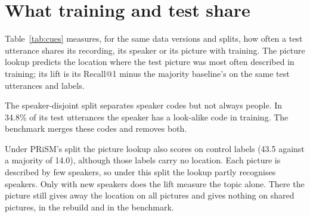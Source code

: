 \documentclass[11pt]{article}
\begin{document}
\section{What training and test share}
\label{app:cues}
Table~\ref{tab:cues} measures, for the same data versions and splits, how often a test utterance shares its
recording, its speaker or its picture with training. The picture lookup predicts the location where
the test picture was most often described in training; its lift is its Recall@1 minus the majority baseline's on
the same test utterances and labels.

The speaker-disjoint split separates speaker codes but not always people. In 34.8\% of its test utterances the
speaker has a look-alike code in training. The benchmark merges these codes and removes both.

Under PRiSM's split the picture lookup also scores on control labels (43.5 against a majority of 14.0), although
those labels carry no location. Each picture is described by few speakers, so under this split the lookup partly
recognises speakers. Only with new speakers does the lift measure the topic alone. There the picture still gives
away the location on all pictures and gives nothing on shared pictures, in the rebuild and in the benchmark.

\begin{table}[t]
\centering\footnotesize

\caption{What each data version and split shares between training and test, as a percentage of test utterances
(the picture columns are Recall@1). On the release the speakers are estimated from calibrated voice embeddings.
A look-alike code is another code of the same district whose voice matches as closely as two halves of one
speaker's recordings. ``Labels real'' is no when every speaker is given another speaker's location. The benchmark
pools its five folds, so every utterance is tested once.}
\label{tab:cues}
\end{table}

\begin{table}[t]
\centering\footnotesize

\caption{Benchmark probes against their own predictions shuffled among speaker groups of the same fold, and
against the shuffle restricted to groups that the channel probe places at the same pincode. Group Recall@1 and km
average each speaker group's pooled prediction, so every group counts once; $p$ is one-sided from 2,000 shuffles.}
\label{tab:checks}
\end{table}
\end{document}
